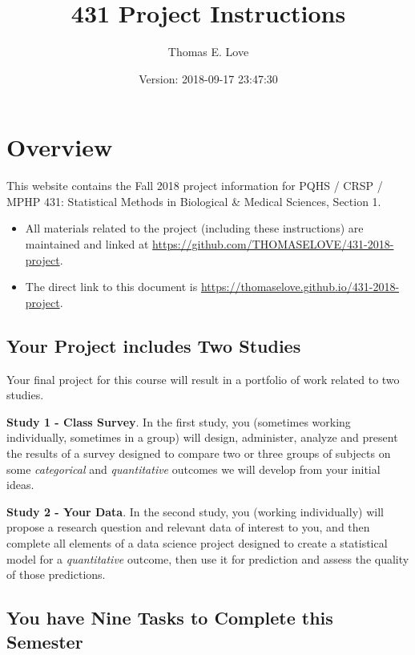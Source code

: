 \documentclass[]{book}
\title{431 Project Instructions}
\author{Thomas E. Love}
\date{Version: 2018-09-17 23:47:30}
\providecommand{\tightlist}{%
  \setlength{\itemsep}{0pt}\setlength{\parskip}{0pt}}
\theoremstyle{definition}
\theoremstyle{definition}
\theoremstyle{definition}
\theoremstyle{remark}
\begin{document}
\maketitle

{
\setcounter{tocdepth}{1}
\tableofcontents
}
\hypertarget{overview}{%
\chapter*{Overview}\label{overview}}

This website contains the Fall 2018 project information for PQHS / CRSP
/ MPHP 431: Statistical Methods in Biological \& Medical Sciences,
Section 1.

\begin{itemize}
\tightlist
\item
  All materials related to the project (including these instructions)
  are maintained and linked at
  \url{https://github.com/THOMASELOVE/431-2018-project}.
\item
  The direct link to this document is
  \url{https://thomaselove.github.io/431-2018-project}.
\end{itemize}

\hypertarget{your-project-includes-two-studies}{%
\section*{Your Project includes Two
Studies}\label{your-project-includes-two-studies}}

Your final project for this course will result in a portfolio of work
related to two studies.

\textbf{Study 1 - Class Survey}. In the first study, you (sometimes
working individually, sometimes in a group) will design, administer,
analyze and present the results of a survey designed to compare two or
three groups of subjects on some \emph{categorical} and
\emph{quantitative} outcomes we will develop from your initial ideas.

\textbf{Study 2 - Your Data}. In the second study, you (working
individually) will propose a research question and relevant data of
interest to you, and then complete all elements of a data science
project designed to create a statistical model for a \emph{quantitative}
outcome, then use it for prediction and assess the quality of those
predictions.

\hypertarget{you-have-nine-tasks-to-complete-this-semester}{%
\section*{You have Nine Tasks to Complete this
Semester}\label{you-have-nine-tasks-to-complete-this-semester}}
\end{document}
